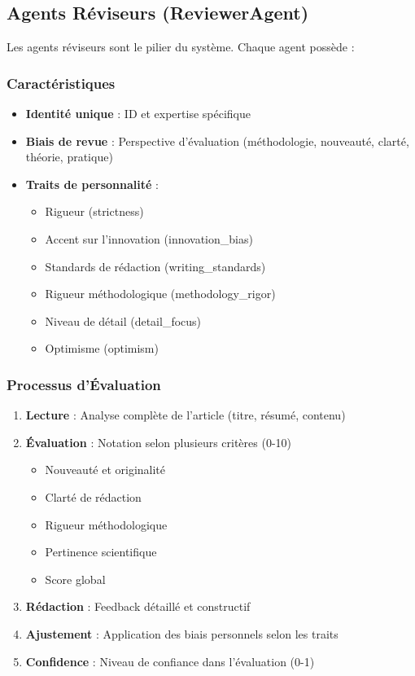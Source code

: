 \documentclass[12pt,a4paper]{article}
\begin{document}
\subsection{Agents Réviseurs (ReviewerAgent)}

Les agents réviseurs sont le pilier du système. Chaque agent possède :

\subsubsection{Caractéristiques}
\begin{itemize}
    \item \textbf{Identité unique} : ID et expertise spécifique
    \item \textbf{Biais de revue} : Perspective d'évaluation (méthodologie, nouveauté, clarté, théorie, pratique)
    \item \textbf{Traits de personnalité} : 
    \begin{itemize}
        \item Rigueur (strictness)
        \item Accent sur l'innovation (innovation\_bias)
        \item Standards de rédaction (writing\_standards)
        \item Rigueur méthodologique (methodology\_rigor)
        \item Niveau de détail (detail\_focus)
        \item Optimisme (optimism)
    \end{itemize}
\end{itemize}

\subsubsection{Processus d'Évaluation}
\begin{enumerate}
    \item \textbf{Lecture} : Analyse complète de l'article (titre, résumé, contenu)
    \item \textbf{Évaluation} : Notation selon plusieurs critères (0-10)
    \begin{itemize}
        \item Nouveauté et originalité
        \item Clarté de rédaction
        \item Rigueur méthodologique
        \item Pertinence scientifique
        \item Score global
    \end{itemize}
    \item \textbf{Rédaction} : Feedback détaillé et constructif
    \item \textbf{Ajustement} : Application des biais personnels selon les traits
    \item \textbf{Confidence} : Niveau de confiance dans l'évaluation (0-1)
\end{enumerate}
\end{document}
